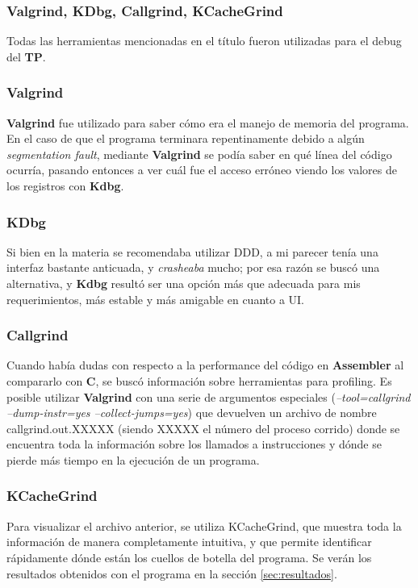 \subsubsection{Valgrind, KDbg, Callgrind, KCacheGrind}
Todas las herramientas mencionadas en el título fueron utilizadas para el debug del \textbf{TP}.

\subsubsection*{Valgrind}
\textbf{Valgrind} fue utilizado para saber cómo era el manejo de memoria del programa. En el caso de que el programa terminara repentinamente debido a algún \textit{segmentation fault}, mediante \textbf{Valgrind} se podía saber en qué línea del código ocurría, pasando entonces a ver cuál fue el acceso erróneo viendo los valores de los registros con \textbf{Kdbg}. 

\subsubsection*{KDbg}
\label{subsec:kdbg}
Si bien en la materia se recomendaba utilizar DDD, a mi parecer tenía una interfaz bastante anticuada, y \textit{crasheaba} mucho; por esa razón se buscó una alternativa, y \textbf{Kdbg} resultó ser una opción más que adecuada para mis requerimientos, más estable y más amigable en cuanto a UI.

\subsubsection*{Callgrind}
\label{subsec:callgrind}
Cuando había dudas con respecto a la performance del código en \textbf{Assembler} al compararlo con \textbf{C}, se buscó información sobre herramientas para profiling. Es posible utilizar \textbf{Valgrind} con una serie de argumentos especiales (\textit{--tool=callgrind --dump-instr=yes --collect-jumps=yes}) que devuelven un archivo de nombre callgrind.out.XXXXX (siendo XXXXX el número del proceso corrido) donde se encuentra toda la información sobre los llamados a instrucciones y dónde se pierde más tiempo en la ejecución de un programa.

\subsubsection*{KCacheGrind}
Para visualizar el archivo anterior, se utiliza KCacheGrind, que muestra toda la información de manera completamente intuitiva, y que permite identificar rápidamente dónde están los cuellos de botella del programa. Se verán los resultados obtenidos con el programa en la sección \ref{sec:resultados}.
